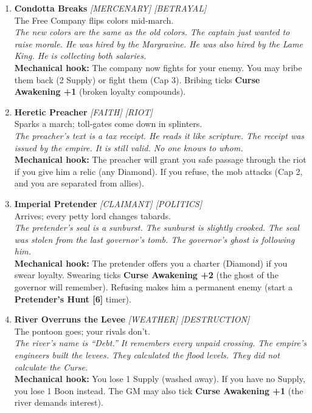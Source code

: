 \begin{enumerate}
\item \textbf{Condotta Breaks} \hfill {} \textit{[MERCENARY] [BETRAYAL]} \\
  The Free Company flips colors mid-march. \\
  \textit{The new colors are the same as the old colors. The captain just wanted to raise morale. He was hired by the Margravine. He was also hired by the Lame King. He is collecting both salaries.} \\
  \textbf{Mechanical hook:} The company now fights for your enemy. You may bribe them back (2 Supply) or fight them (Cap 3). Bribing ticks \textbf{Curse Awakening +1} (broken loyalty compounds).

\item \textbf{Heretic Preacher} \hfill {} \textit{[FAITH] [RIOT]} \\
  Sparks a march; toll-gates come down in splinters. \\
  \textit{The preacher's text is a tax receipt. He reads it like scripture. The receipt was issued by the empire. It is still valid. No one knows to whom.} \\
  \textbf{Mechanical hook:} The preacher will grant you safe passage through the riot if you give him a relic (any Diamond). If you refuse, the mob attacks (Cap 2, and you are separated from allies).

\item \textbf{Imperial Pretender} \hfill {} \textit{[CLAIMANT] [POLITICS]} \\
  Arrives; every petty lord changes tabards. \\
  \textit{The pretender's seal is a sunburst. The sunburst is slightly crooked. The seal was stolen from the last governor's tomb. The governor's ghost is following him.} \\
  \textbf{Mechanical hook:} The pretender offers you a charter (Diamond) if you swear loyalty. Swearing ticks \textbf{Curse Awakening +2} (the ghost of the governor will remember). Refusing makes him a permanent enemy (start a \textbf{Pretender's Hunt [6]} timer).

\item \textbf{River Overruns the Levee} \hfill {} \textit{[WEATHER] [DESTRUCTION]} \\
  The pontoon goes; your rivals don't. \\
  \textit{The river's name is ``Debt.'' It remembers every unpaid crossing. The empire's engineers built the levees. They calculated the flood levels. They did not calculate the Curse.} \\
  \textbf{Mechanical hook:} You lose 1 Supply (washed away). If you have no Supply, you lose 1 Boon instead. The GM may also tick \textbf{Curse Awakening +1} (the river demands interest).


\end{enumerate}
